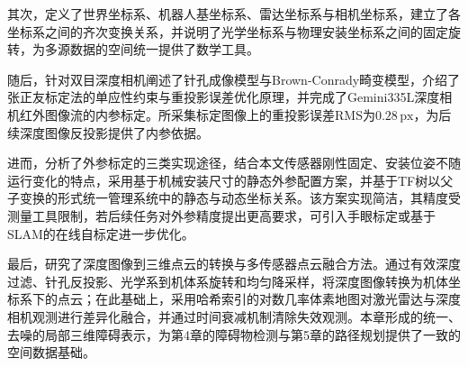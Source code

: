 其次，定义了世界坐标系、机器人基坐标系、雷达坐标系与相机坐标系，建立了各坐标系之间的齐次变换关系，并说明了光学坐标系与物理安装坐标系之间的固定旋转，为多源数据的空间统一提供了数学工具。

随后，针对双目深度相机阐述了针孔成像模型与Brown-Conrady畸变模型，介绍了张正友标定法的单应性约束与重投影误差优化原理，并完成了Gemini335L深度相机红外图像流的内参标定。所采集标定图像上的重投影误差RMS为$0.28\,\mathrm{px}$，为后续深度图像反投影提供了内参依据。

进而，分析了外参标定的三类实现途径，结合本文传感器刚性固定、安装位姿不随运行变化的特点，采用基于机械安装尺寸的静态外参配置方案，并基于TF树以父子变换的形式统一管理系统中的静态与动态坐标关系。该方案实现简洁，其精度受测量工具限制，若后续任务对外参精度提出更高要求，可引入手眼标定或基于SLAM的在线自标定进一步优化。

最后，研究了深度图像到三维点云的转换与多传感器点云融合方法。通过有效深度过滤、针孔反投影、光学系到机体系旋转和均匀降采样，将深度图像转换为机体坐标系下的点云；在此基础上，采用哈希索引的对数几率体素地图对激光雷达与深度相机观测进行差异化融合，并通过时间衰减机制清除失效观测。本章形成的统一、去噪的局部三维障碍表示，为第4章的障碍物检测与第5章的路径规划提供了一致的空间数据基础。
